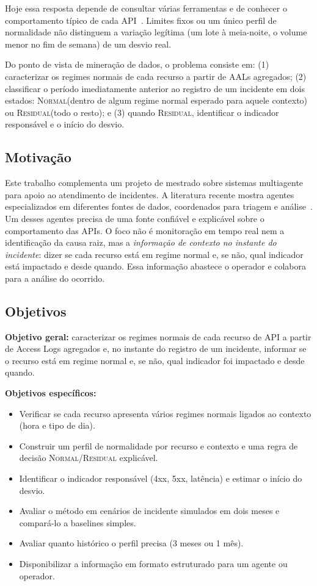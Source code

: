 \documentclass[sigconf,nonacm]{acmart}
\newcommand{\Normal}{\textsc{Normal}\xspace}
\newcommand{\Residual}{\textsc{Residual}\xspace}
\begin{document}
Hoje essa resposta depende de consultar várias ferramentas e de conhecer o comportamento típico de cada API~\citep{zhang2025isre}. Limites fixos ou um único perfil de normalidade não distinguem a variação legítima (um lote à meia-noite, o volume menor no fim de semana) de um desvio real.

Do ponto de vista de mineração de dados, o problema consiste em: (1) caracterizar os regimes normais de cada recurso a partir de AALs agregados; (2) classificar o período imediatamente anterior ao registro de um incidente em dois estados: \Normal (dentro de algum regime normal esperado para aquele contexto) ou \Residual (todo o resto); e (3) quando \Residual, identificar o indicador responsável e o início do desvio.

\subsection{Motivação}
Este trabalho complementa um projeto de mestrado sobre sistemas multiagente para apoio ao atendimento de incidentes. A literatura recente mostra agentes especializados em diferentes fontes de dados, coordenados para triagem e análise~\citep{yu2025triangle,luo2025opsagent,zhang2025isre}. Um desses agentes precisa de uma fonte confiável e explicável sobre o comportamento das APIs. O foco não é monitoração em tempo real nem a identificação da causa raiz, mas a \emph{informação de contexto no instante do incidente}: dizer se cada recurso está em regime normal e, se não, qual indicador está impactado e desde quando. Essa informação abastece o operador e colabora para a análise do ocorrido.

\subsection{Objetivos}
\textbf{Objetivo geral:} caracterizar os regimes normais de cada recurso de API a partir de Access Logs agregados e, no instante do registro de um incidente, informar se o recurso está em regime normal e, se não, qual indicador foi impactado e desde quando.

\textbf{Objetivos específicos:}
\begin{itemize}
  \item Verificar se cada recurso apresenta vários regimes normais ligados ao contexto (hora e tipo de dia).
  \item Construir um perfil de normalidade por recurso e contexto e uma regra de decisão \Normal/\Residual explicável.
  \item Identificar o indicador responsável (4xx, 5xx, latência) e estimar o início do desvio.
  \item Avaliar o método em cenários de incidente simulados em dois meses e compará-lo a baselines simples.
  \item Avaliar quanto histórico o perfil precisa (3 meses ou 1 mês).
  \item Disponibilizar a informação em formato estruturado para um agente ou operador.
\end{itemize}
\end{document}
